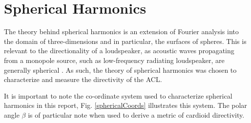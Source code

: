 \documentclass{report}
\begin{document}
    \section{Spherical Harmonics}
        The theory behind spherical harmonics is an extension of Fourier analysis into the domain of three-dimensions and in particular, the surfaces of spheres.
        This is relevant to the directionality of a loudspeaker, as acoustic waves propagating from a monopole source, such as low-frequency radiating loudspeaker, are generally spherical \cite{kinslerFreySpherical}.
        As such, the theory of spherical harmonics was chosen to characterize and measure the directivity of the ACL.

        It is important to note the co-ordinate system used to characterize spherical harmonics in this report, Fig. \ref{sphericalCoords} illustrates this system.
        The polar angle $\beta$ is of particular note when used to derive a metric of cardioid directivity.
    
\end{document}
